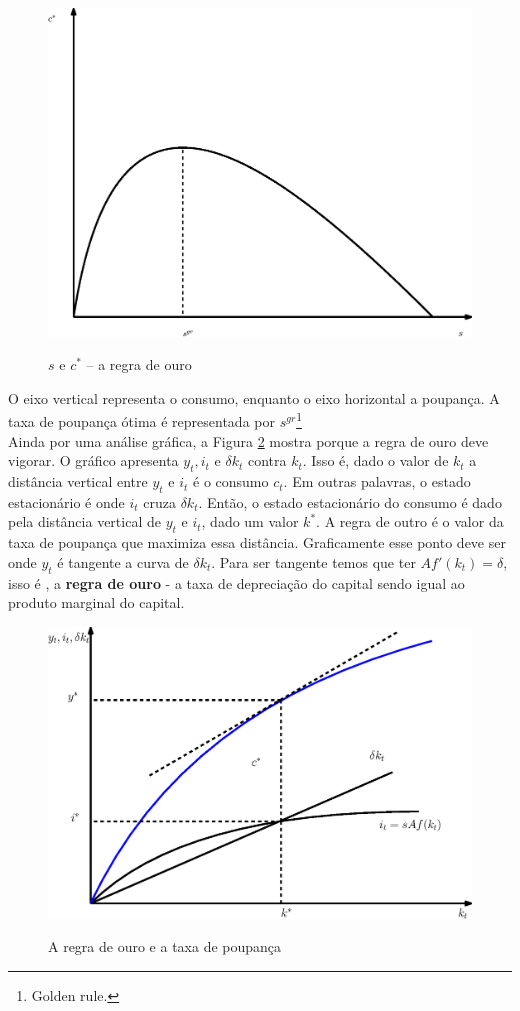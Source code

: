 \documentclass[11pt,a4paper]{article}
\begin{document}
\begin{figure}[!h]
\centering
\caption{$s$ e $c^{\ast}$ -- a regra de ouro} \vspace{2ex}
\includegraphics[scale=.4]{solow09.eps}
\label{fig:goldenrule}
\end{figure}
O eixo vertical representa o consumo, enquanto o eixo horizontal a poupança. A taxa de poupança ótima é representada por $s^{gr}$\footnote{Golden rule.}\\

Ainda por uma análise gráfica, a Figura \ref{fig:goldenrule2} mostra porque a regra de ouro deve vigorar. O gráfico apresenta $y_t, i_t$ e $\delta k_t$ contra $k_t$. Isso é, dado o valor de $k_t$ a distância vertical entre $y_t$ e $i_t$ é o consumo $c_t$. Em outras palavras, o estado estacionário é onde $i_t$ cruza $\delta k_t$. Então, o estado estacionário do consumo é dado pela distância vertical de $y_t$ e $i_t$, dado um valor $k^{\ast}$. A regra de outro é o valor da taxa de poupança que maximiza essa distância. Graficamente esse ponto deve ser onde $y_t$ é tangente a curva de $\delta k_t$. Para ser tangente temos que ter $Af'(k_t) = \delta$, isso é , a \textbf{regra de ouro} - a taxa de depreciação do capital sendo igual ao produto marginal do capital.

\begin{figure}[!h]
\centering
\caption{A regra de ouro e a taxa de poupança} \vspace{2ex}
\includegraphics[scale=.6]{solow10.eps}
\label{fig:goldenrule2}
\end{figure}
\end{document}
